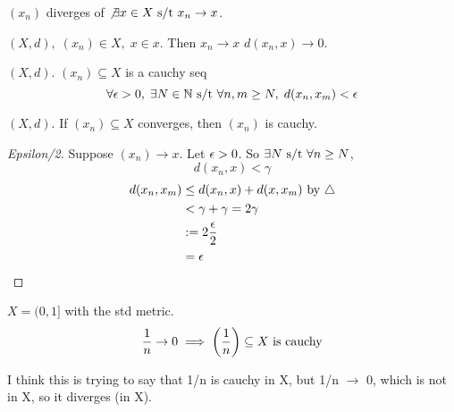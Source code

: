 \documentclass[12pt]{article}
\begin{document}
\bboxdefn
\begin{defn}[Divergence]\label{defn:divergence}
  \((x_n)\) diverges of \(\not\exists x\in X\text{ s/t } x_n\to x\).
\end{defn}
\ebox

\bboxnote
\begin{note}
  \((X,d),\;(x_n)\in X,\;x\in x\). Then \(x_n\to x\) 
  \(d(x_n,x)\to 0\).
\end{note}
\ebox

\bboxdefn
\begin{defn}[Cauchy]
  \((X,d)\). \((x_n)\subseteq X\) is a cauchy seq 
  \[\forall\epsilon>0,\;\exists N\in\mathbb N\text{ s/t }\forall n,m\ge N,\;
  d(x_n,x_m)<\epsilon\]
\end{defn}
\ebox


\bboxprop
\begin{prop}
  \((X,d)\). If \((x_n)\subseteq X\) converges, then \((x_n)\) is cauchy.
\end{prop}
\ebox

\bboxproof
\begin{proof}[Epsilon/2]
  Suppose \((x_n)\to x\). Let \(\epsilon>0\). So \(\exists N\text{ s/t }\forall n\ge N\), 
  \[d(x_n,x)<\gamma\]
  \begin{align*}
    d(x_n,x_m)&\le d(x_n,x)+d(x,x_m)\text{ by }\triangle\\
              &<\gamma+\gamma=2\gamma\\
              &:=2\frac{\epsilon}2\\
              &=\epsilon
  \end{align*}
\end{proof}
\ebox

\bboxexam
\begin{exam}
  \(X=(0,1]\) with the std metric.
  \[\frac1n\to0\implies\left(\frac1n\right)\subseteq X\text{ is cauchy}\]
  \bboxnote
  \begin{note}
    I think this is trying to say that 1/n is cauchy in X, but 
    1/n \(\to\) 0, which is not in X, so it diverges (in X).
  \end{note}
  \ebox

\end{exam}
\ebox


\end{document}
